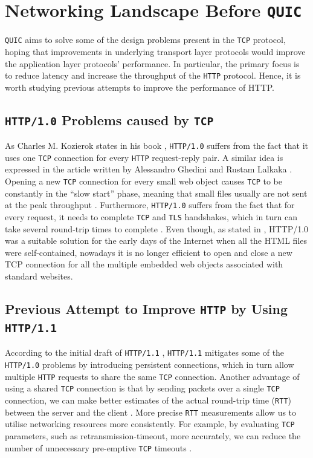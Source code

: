 \documentclass[12pt,a4paper,twoside,openright]{report}
\begin{document}
\section{Networking Landscape Before \texttt{QUIC}}
    \texttt{QUIC} aims to solve some of the design problems present in the \texttt{TCP} protocol, hoping that improvements in underlying transport layer protocols would improve the application layer protocols' performance.
    In particular, the primary focus is to reduce latency and increase the throughput of the \texttt{HTTP} protocol.
    Hence, it is worth studying previous attempts to improve the performance of HTTP.


\subsection{\texttt{HTTP/1.0} Problems caused by \texttt{TCP}}
    As Charles M. Kozierok states in his book \cite{TCP_IP_Guide_Book},
    \texttt{HTTP/1.0} suffers from the fact that it uses one \texttt{TCP} connection for every \texttt{HTTP} request-reply pair. 
    A similar idea is expressed in the article written by Alessandro Ghedini and Rustam Lalkaka
    \cite{HTTP_3_the_past_the_present_and_the_future}.
    Opening a new \texttt{TCP} connection for every small web object causes \texttt{TCP} to be constantly in the \enquote{slow start} phase, meaning that small files usually are not sent at the peak throughput \cite{HTTP_3_the_past_the_present_and_the_future}.
    Furthermore, \texttt{HTTP/1.0} suffers from the fact that for every request, it needs to complete \texttt{TCP} and \texttt{TLS} handshakes, which in turn can take several round-trip times to complete \cite{HTTP_3_the_past_the_present_and_the_future}.
    Even though, as stated in \cite{TCP_IP_Guide_Book_2}, HTTP/1.0 was a suitable solution for the early days of the Internet when all the HTML files were self-contained, nowadays it is no longer efficient to open and close a new TCP connection for all the multiple embedded web objects associated with standard websites.

\subsection{Previous Attempt to Improve \texttt{HTTP} by Using \texttt{HTTP/1.1}}

According to the initial draft of \texttt{HTTP/1.1} \cite{RFC2068}, \texttt{HTTP/1.1} mitigates some of the \texttt{HTTP/1.0} problems by introducing persistent connections, which in turn allow multiple \texttt{HTTP} requests to share the same \texttt{TCP} connection.
Another advantage of using a shared \texttt{TCP} connection is that by sending packets over a single \texttt{TCP} connection, we can make better estimates of the actual round-trip time (\texttt{RTT}) between the server and the client \cite{bib_Computer_Networking_L6}.
More precise \texttt{RTT} measurements allow us to utilise networking resources more consistently.
For example, by evaluating \texttt{TCP} parameters, such as retransmission-timeout, more accurately, we can reduce the number of unnecessary pre-emptive \texttt{TCP} timeouts \cite{bib_rtt_tcp_Retransmissions}.
\end{document}
